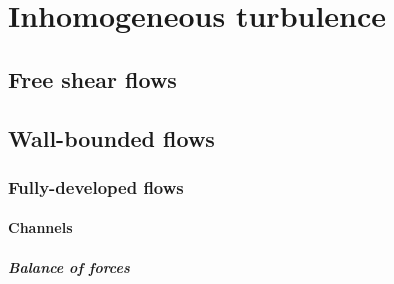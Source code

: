 \documentclass[oneside,a4paper,11pt]{report}
\newcommand{\uiavg}{\langle U_i \rangle}
\newcommand{\ujavg}{\langle U_j \rangle}
\newcommand{\ulavg}{\langle U_l \rangle}
\begin{document}

\part{Inhomogeneous turbulence}

\chapter{Free shear flows}

\chapter{Wall-bounded flows}

\section{Fully-developed flows}

\subsection{Channels}

\subsubsection{Balance of forces}
\end{document}
